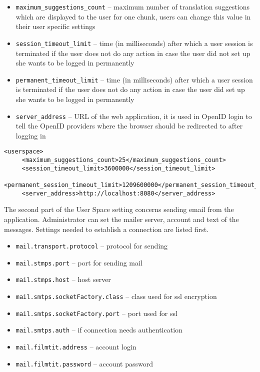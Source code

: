 \begin{itemize} 
\item \verb#maximum_suggestions_count# -- maximum number of translation suggestions which are displayed to the user for one chunk, users can change this value in their user specific settings
\item \verb#session_timeout_limit# -- time (in milliseconds) after which a user session is terminated if the user does not do any action in case the user did not set up she wants to be logged in permanently
\item \verb#permanent_timeout_limit# -- time (in milliseconds) after which a user session is terminated if the user does not do any action in case the user did set up she wants to be logged in permanently
\item \verb#server_address# -- URL of the web application, it is used in OpenID login to tell the OpenID providers where the browser should be redirected to after logging in
\end{itemize}

\begin{lstlisting}
<userspace>
     <maximum_suggestions_count>25</maximum_suggestions_count>
     <session_timeout_limit>3600000</session_timeout_limit>
     <permanent_session_timeout_limit>1209600000</permanent_session_timeout_limit>
     <server_address>http://localhost:8080</server_address>
\end{lstlisting}


The second part of the User Space setting concerns sending email from the application. Administrator can set the mailer server, account and text of the messages. Settings needed to establish a connection are listed first.

\begin{itemize}
   \item \verb#mail.transport.protocol# -- protocol for sending
   \item \verb#mail.stmps.port# -- port for sending mail
   \item \verb#mail.stmps.host# -- host server
	\item \verb#mail.smtps.socketFactory.class# -- class used for ssl encryption
	\item \verb#mail.smtps.socketFactory.port# -- port used for ssl
	\item \verb#mail.smtps.auth# -- if connection needs authentication
	\item \verb#mail.filmtit.address# -- account login
	\item \verb#mail.filmtit.password# -- account password
\end{itemize}

